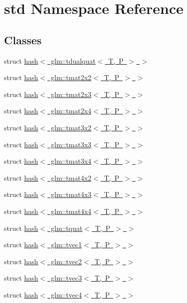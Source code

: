 \hypertarget{namespacestd}{}\section{std Namespace Reference}
\label{namespacestd}
\subsection*{Classes}
\begin{DoxyCompactItemize}
\item 
struct \mbox{\hyperlink{structstd_1_1hash_3_01glm_1_1tdualquat_3_01_t_00_01_p_01_4_01_4}{hash$<$ glm\+::tdualquat$<$ T, P $>$ $>$}}
\item 
struct \mbox{\hyperlink{structstd_1_1hash_3_01glm_1_1tmat2x2_3_01_t_00_01_p_01_4_01_4}{hash$<$ glm\+::tmat2x2$<$ T, P $>$ $>$}}
\item 
struct \mbox{\hyperlink{structstd_1_1hash_3_01glm_1_1tmat2x3_3_01_t_00_01_p_01_4_01_4}{hash$<$ glm\+::tmat2x3$<$ T, P $>$ $>$}}
\item 
struct \mbox{\hyperlink{structstd_1_1hash_3_01glm_1_1tmat2x4_3_01_t_00_01_p_01_4_01_4}{hash$<$ glm\+::tmat2x4$<$ T, P $>$ $>$}}
\item 
struct \mbox{\hyperlink{structstd_1_1hash_3_01glm_1_1tmat3x2_3_01_t_00_01_p_01_4_01_4}{hash$<$ glm\+::tmat3x2$<$ T, P $>$ $>$}}
\item 
struct \mbox{\hyperlink{structstd_1_1hash_3_01glm_1_1tmat3x3_3_01_t_00_01_p_01_4_01_4}{hash$<$ glm\+::tmat3x3$<$ T, P $>$ $>$}}
\item 
struct \mbox{\hyperlink{structstd_1_1hash_3_01glm_1_1tmat3x4_3_01_t_00_01_p_01_4_01_4}{hash$<$ glm\+::tmat3x4$<$ T, P $>$ $>$}}
\item 
struct \mbox{\hyperlink{structstd_1_1hash_3_01glm_1_1tmat4x2_3_01_t_00_01_p_01_4_01_4}{hash$<$ glm\+::tmat4x2$<$ T, P $>$ $>$}}
\item 
struct \mbox{\hyperlink{structstd_1_1hash_3_01glm_1_1tmat4x3_3_01_t_00_01_p_01_4_01_4}{hash$<$ glm\+::tmat4x3$<$ T, P $>$ $>$}}
\item 
struct \mbox{\hyperlink{structstd_1_1hash_3_01glm_1_1tmat4x4_3_01_t_00_01_p_01_4_01_4}{hash$<$ glm\+::tmat4x4$<$ T, P $>$ $>$}}
\item 
struct \mbox{\hyperlink{structstd_1_1hash_3_01glm_1_1tquat_3_01_t_00_01_p_01_4_01_4}{hash$<$ glm\+::tquat$<$ T, P $>$ $>$}}
\item 
struct \mbox{\hyperlink{structstd_1_1hash_3_01glm_1_1tvec1_3_01_t_00_01_p_01_4_01_4}{hash$<$ glm\+::tvec1$<$ T, P $>$ $>$}}
\item 
struct \mbox{\hyperlink{structstd_1_1hash_3_01glm_1_1tvec2_3_01_t_00_01_p_01_4_01_4}{hash$<$ glm\+::tvec2$<$ T, P $>$ $>$}}
\item 
struct \mbox{\hyperlink{structstd_1_1hash_3_01glm_1_1tvec3_3_01_t_00_01_p_01_4_01_4}{hash$<$ glm\+::tvec3$<$ T, P $>$ $>$}}
\item 
struct \mbox{\hyperlink{structstd_1_1hash_3_01glm_1_1tvec4_3_01_t_00_01_p_01_4_01_4}{hash$<$ glm\+::tvec4$<$ T, P $>$ $>$}}
\end{DoxyCompactItemize}
